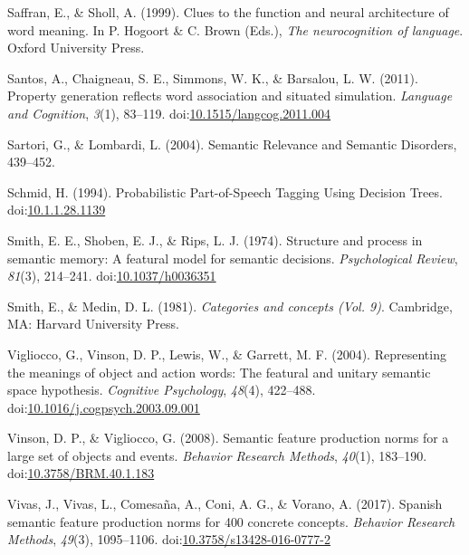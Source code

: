 \documentclass[man]{apa6}
\begin{document}
\leavevmode\hypertarget{ref-Saffran1999}{}%
Saffran, E., \& Sholl, A. (1999). Clues to the function and neural architecture of word meaning. In P. Hogoort \& C. Brown (Eds.), \emph{The neurocognition of language}. Oxford University Press.

\leavevmode\hypertarget{ref-Santos2011}{}%
Santos, A., Chaigneau, S. E., Simmons, W. K., \& Barsalou, L. W. (2011). Property generation reflects word association and situated simulation. \emph{Language and Cognition}, \emph{3}(1), 83--119. doi:\href{https://doi.org/10.1515/langcog.2011.004}{10.1515/langcog.2011.004}

\leavevmode\hypertarget{ref-Sartori2004}{}%
Sartori, G., \& Lombardi, L. (2004). Semantic Relevance and Semantic Disorders, 439--452.

\leavevmode\hypertarget{ref-Schmid1994}{}%
Schmid, H. (1994). Probabilistic Part-of-Speech Tagging Using Decision Trees. doi:\href{https://doi.org/10.1.1.28.1139}{10.1.1.28.1139}

\leavevmode\hypertarget{ref-Smith1974}{}%
Smith, E. E., Shoben, E. J., \& Rips, L. J. (1974). Structure and process in semantic memory: A featural model for semantic decisions. \emph{Psychological Review}, \emph{81}(3), 214--241. doi:\href{https://doi.org/10.1037/h0036351}{10.1037/h0036351}

\leavevmode\hypertarget{ref-Smith1981}{}%
Smith, E., \& Medin, D. L. (1981). \emph{Categories and concepts (Vol. 9)}. Cambridge, MA: Harvard University Press.

\leavevmode\hypertarget{ref-Vigliocco2004}{}%
Vigliocco, G., Vinson, D. P., Lewis, W., \& Garrett, M. F. (2004). Representing the meanings of object and action words: The featural and unitary semantic space hypothesis. \emph{Cognitive Psychology}, \emph{48}(4), 422--488. doi:\href{https://doi.org/10.1016/j.cogpsych.2003.09.001}{10.1016/j.cogpsych.2003.09.001}

\leavevmode\hypertarget{ref-Vinson2008}{}%
Vinson, D. P., \& Vigliocco, G. (2008). Semantic feature production norms for a large set of objects and events. \emph{Behavior Research Methods}, \emph{40}(1), 183--190. doi:\href{https://doi.org/10.3758/BRM.40.1.183}{10.3758/BRM.40.1.183}

\leavevmode\hypertarget{ref-Vivas2017}{}%
Vivas, J., Vivas, L., Comesaña, A., Coni, A. G., \& Vorano, A. (2017). Spanish semantic feature production norms for 400 concrete concepts. \emph{Behavior Research Methods}, \emph{49}(3), 1095--1106. doi:\href{https://doi.org/10.3758/s13428-016-0777-2}{10.3758/s13428-016-0777-2}
\end{document}

